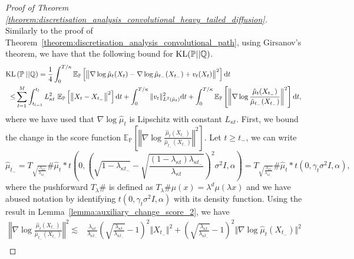 \begin{proof}[Proof of Theorem \ref{theorem:discretisation_analysis_convolutional_heavy_tailed_diffusion}]
Similarly to the proof of Theorem~\ref{theorem:discretisation_analysis_convolutional_path}, using Girsanov's theorem, we have that the following bound for $\operatorname*{KL}(\mathbb{P}||\mathbb{Q})$.
\begin{align}
    \kl&\left(\mathbb{P}\;||\mathbb{Q}\right)= \frac{1}{4}\int_0^{T/\kappa}\mathbb{E}_{\mathbb{P}}\left[\left\Vert \nabla\log \hat{\mu}_t(X_t)-\nabla \log \hat{\mu}_{t_-}(X_{t_-}) + v_t(X_t)\right\Vert^2\right]\md t\nonumber\\
    \leq&  \sum_{l=1}^M\int_{t_{l-1}}^{t_l} L_{\kappa t}^2 \ \mathbb{E}_{\mathbb{P}} \left[\left\Vert X_t-X_{t_-}\right\Vert^2\right]\md t+ \int_0^{T/\kappa} \Vert v_t\Vert^2_{L^2({\hat{\mu}}_t)} \md t+ \int_0^{T/\kappa}\mathbb{E}_{\mathbb{P}} \left[\left\Vert \nabla\log \frac{\hat{\mu}_t(X_{t_-})}{\hat{\mu}_{t_-}(X_{t_-})}\right\Vert^2\right]\md t, \label{eq:kl_path_bound_intermediate_heavy_tail_diffusion}
\end{align}
where we have used that  $\nabla\log\hat{\mu}_{t}$ is Lipschitz with constant $L_{\kappa t}$. 
First, we bound the change in the score function $\mathbb{E}_{\mathbb{P}} \left[\left\Vert \nabla\log \frac{\hat{\mu}_t(X_{t_-})}{\hat{\mu}_{t_-}(X_{t_-})}\right\Vert^2\right]$. Let $t\geq t_{-}$, we can write
\begin{equation*}
    \hat{\mu}_{t_-} = T_{\sqrt{\frac{\lambda_{\kappa t}}{\lambda_{\kappa t_-}}}} \#\hat{\mu}_t * t\left(0, \left(\sqrt{1-\lambda_{\kappa t_-}}-\sqrt{\frac{(1-\lambda_{\kappa t})\lambda_{\kappa t_-}}{\lambda_{\kappa t}}}\right)^2\sigma^2 I, \alpha\right) = T_{\sqrt{\frac{\lambda_{\kappa t}}{\lambda_{\kappa t_-}}}} \#\hat{\mu}_t * t\left(0, \gamma_t\sigma^2 I, \alpha\right) ,
\end{equation*}
where the pushforward $T_{\lambda}\#$ is defined as $T_{\lambda}\#\mu(x) = \lambda^d \mu(\lambda x)$ and we have abused notation by identifying $t(0, \gamma_t\sigma^2 I, \alpha)$ with its density function. Using the result in Lemma~\ref{lemma:auxiliary_change_score_2}, we have
\begin{align*}
        \left\Vert \nabla\log \frac{\hat{\mu}_t(X_{t_-})}{\hat{\mu}_{t_-}(X_{t_-})}\right\Vert^2\lesssim& \frac{\lambda_{\kappa t}}{\lambda_{\kappa t_-}} \left(\sqrt{\frac{\lambda_{\kappa t}}{\lambda_{\kappa t_-}}}-1\right)^2 \Vert X_{t_-}\Vert^2 + \left(\sqrt{\frac{\lambda_{\kappa t}}{\lambda_{\kappa t_-}}}-1\right)^2\Vert \nabla \log \hat{\mu}_t(X_{t_-})\Vert^2 \\

\end{align*}
\end{proof}
